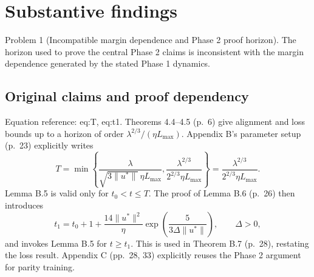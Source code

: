 \documentclass[10pt]{article}
\begin{document}
\section*{Substantive findings}
Problem 1 (Incompatible margin dependence and Phase 2 proof horizon).  The horizon used to prove the central Phase 2 claims is inconsistent with the margin dependence generated by the stated Phase 1 dynamics.\par
\subsection*{Original claims and proof dependency}
Equation reference: eq:T, eq:t1. Theorems 4.4–4.5 (p. 6) give alignment and loss bounds up to a horizon of order \(\lambda^{2/3}/(\eta L_{\max})\). Appendix B’s parameter setup (p. 23) explicitly writes \[
T=\min\left\{
\frac{\lambda}{\sqrt{3\|u^\ast\|}\,\eta L_{\max}},
\frac{\lambda^{2/3}}{2^{2/3}\eta L_{\max}}
\right\}
=\frac{\lambda^{2/3}}{2^{2/3}\eta L_{\max}}.\] Lemma B.5 is valid only for \(t_0<t\le T\). The proof of Lemma B.6 (p. 26) then introduces \[
t_1=t_0+1+\frac{14\|u^\ast\|^2}{\eta}
\exp\left(\frac{5}{3\Delta\|u^\ast\|}\right),\qquad \Delta>0,\] and invokes Lemma B.5 for \(t\ge t_1\). This is used in Theorem B.7 (p. 28), restating the loss result. Appendix C (pp. 28, 33) explicitly reuses the Phase 2 argument for parity training.\par
\end{document}
